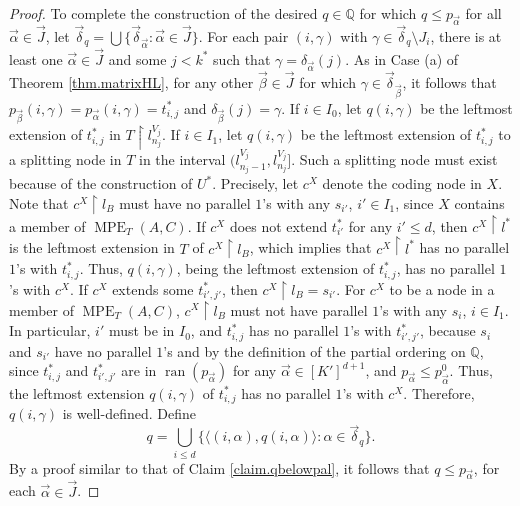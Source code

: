 \documentclass{amsart}
\theoremstyle{remark}
\theoremstyle{definition}
\theoremstyle{remark}
\newcommand{\al}{\alpha}
\DeclareMathOperator{\ran}{ran}
\DeclareMathOperator{\MPE}{MPE}
\newcommand{\re}{\restriction}
\newcommand{\bQ}{\mathbb{Q}}
\newcommand{\lgl}{\langle}
\newcommand{\rgl}{\rangle}
\begin{document}
\begin{proof}
To complete the construction of the desired $q\in \bQ$ for which $q\le p_{\vec\al}$ for all $\vec\al\in \vec{J}$,
let  $\vec{\delta}_q=\bigcup\{\vec{\delta}_{\vec\al}:\vec\al\in \vec{J}\}$.
For each pair $(i,\gamma)$  with  $\gamma\in\vec{\delta}_q\setminus
J_i$,
there is at least one $\vec{\al}\in\vec{J}$ and some $j<k^*$ such that $\gamma=\delta_{\vec\al}(j)$.
As in Case (a) of Theorem \ref{thm.matrixHL},
for any other $\vec\beta\in\vec{J}$ for which $\gamma\in\vec{\delta}_{\vec\beta}$,
it follows
 that
$p_{\vec\beta}(i,\gamma)=p_{\vec{\al}}(i,\gamma)=t^*_{i,j}$ and  $\delta_{\vec\beta}(j)=\gamma$.
If $i\in I_0$,
let $q(i,\gamma)$ be the leftmost extension
 of $t_{i,j}^*$ in  $T\re l^{V_j}_{n_j}$.
If $i\in I_1$, let $q(i,\gamma)$ be the leftmost extension of $t^*_{i,j}$ to a splitting node in $T$
in the interval
 $(l^{V_j}_{n_j-1}, l^{V_j}_{n_j}]$.
Such a splitting node must exist because of the construction of $U^*$.
Precisely,
let $c^X$ denote the coding node in $X$.
Note that $c^X\re l_B$ must have no parallel $1$'s with any $s_{i'}$, $i'\in I_1$, since $X$ contains a member of $\MPE_T(A,C)$.
If $c^X$ does not extend $t^*_{i'}$ for any $i'\le d$,
then $c^X\re l^*$ is the leftmost extension in $T$ of
$c^X\re l_B$,
which implies that
 $c^X\re l^*$ has no  parallel $1$'s  with  $t^*_{i,j}$.
Thus,  $q(i,\gamma)$, being the leftmost extension of $t^*_{i,j}$, has no parallel $1$'s with $c^X$.
If  $c^X$ extends some $t^*_{i',j'}$,
then $c^X\re l_B=s_{i'}$.
For $c^X$ to be a node in a member of $\MPE_T(A,C)$, $c^X\re l_B$ must not have parallel $1$'s with any $s_i$, $i\in I_1$.
In particular,  $i'$ must be in $ I_0$, and $t^*_{i,j}$ has no parallel $1$'s with $t^*_{i',j'}$,
because $s_i$ and $s_{i'}$ have no parallel $1$'s
and by
 the definition of the partial ordering on $\bQ$, since $t^*_{i,j}$ and $t^*_{i',j'}$  are in $\ran(p_{\vec\al})$ for  any $\vec\al\in [K']^{d+1}$,
and $p_{\vec\al}\le p^0_{\vec\al}$.
Thus, the leftmost extension $q(i,\gamma)$ of $t^*_{i,j}$ has no parallel $1$'s with $c^X$.
Therefore, $q(i,\gamma)$ is well-defined.
Define
\begin{equation}
q=\bigcup_{i\le d}\{\lgl (i,\al),q(i,\al)\rgl: \al\in \vec{\delta}_q\}.
\end{equation}
By a  proof similar to that of
Claim \ref{claim.qbelowpal},
it follows that
$q\le p_{\vec\al}$,
for each $\vec\al\in \vec{J}$.






\end{proof}
\end{document}
